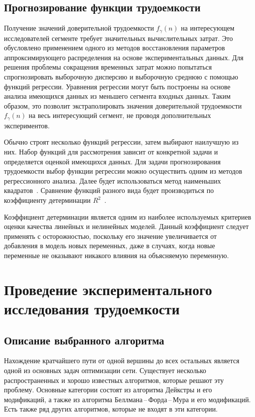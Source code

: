 \documentclass[a4paper, article, 12pt]{extarticle}
\begin{document}
\subsection{Прогнозирование функции трудоемкости}\label{sec:compelixy_prediction}

Получение значений доверительной трудоемкости $f_{\gamma}(n)$ на интересующем исследователей сегменте требует значительных вычислительных затрат. Это обусловлено применением одного из методов восстановления параметров аппроксимирующего распределения на основе экспериментальных данных. Для решения проблемы сокращения временных затрат можно попытаться спрогнозировать выборочную дисперсию и выборочную среднюю с помощью функций регрессии. Уравнения регрессии могут быть построены на основе анализа имеющихся данных из меньшего сегмента входных данных. Таким образом, это позволит экстраполировать значения доверительной трудоемкости $f_{\gamma}(n)$ на весь интересующий сегмент, не проводя дополнительных экспериментов.

Обычно строят несколько функций регрессии, затем выбирают наилучшую из них. Набор функций для рассмотрения зависит от конкретной задачи и определяется оценкой имеющихся данных. Для задачи прогнозирования трудоемкости выбор функции регрессии можно осуществить одним из методов регрессионного анализа. Далее будет использоваться метод наименьших квадратов~\cite{hughes}. Сравнение функций разного вида будет производиться по коэффициенту детерминации $R^2$~\cite{hughes}.

Коэффициент детерминации является одним из наиболее используемых критериев оценки качества линейных и нелинейных моделей. Данный коэффициент следует применять с осторожностью, поскольку его значение увеличивается от добавления в модель новых переменных, даже в случаях, когда новые переменные не оказывают никакого влияния на объясняемую переменную.

\section{Проведение экспериментального исследования трудоемкости}\label{sec:practical_complexity_research}

\subsection{Описание выбранного алгоритма}\label{sec:pallotino_algorithm}

Нахождение кратчайшего пути от одной вершины до всех остальных является одной из основных задач оптимизации сети. Существует несколько распространенных и хорошо известных алгоритмов, которые решают эту проблему. Основные категории состоят из алгоритма Дейкстры и его модификаций, а также из алгоритма Беллмана\,--\,Форда\,--\,Мура и его модификаций. Есть также ряд других алгоритмов, которые не входят в эти категории.
\end{document}
